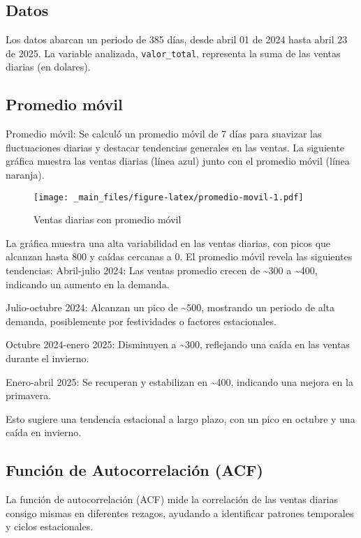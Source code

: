 \documentclass[
]{book}
\begin{document}
\subsection{Datos}\label{datos}

Los datos abarcan un periodo de 385 días, desde abril 01 de 2024 hasta
abril 23 de 2025. La variable analizada, \texttt{valor\_total},
representa la suma de las ventas diarias (en dolares).

\subsection{Promedio móvil}\label{promedio-muxf3vil}

Promedio móvil: Se calculó un promedio móvil de 7 días para suavizar las
fluctuaciones diarias y destacar tendencias generales en las ventas. La
siguiente gráfica muestra las ventas diarias (línea azul) junto con el
promedio móvil (línea naranja).

\begin{figure}
\centering
\texttt{[image: \_main\_files/figure-latex/promedio-movil-1.pdf]}
\caption{Ventas diarias con promedio móvil}
\end{figure}

La gráfica muestra una alta variabilidad en las ventas diarias, con
picos que alcanzan hasta 800 y caídas cercanas a 0. El promedio móvil
revela las siguientes tendencias: Abril-julio 2024: Las ventas promedio
crecen de \textasciitilde300 a \textasciitilde400, indicando un aumento
en la demanda.

Julio-octubre 2024: Alcanzan un pico de \textasciitilde500, mostrando un
periodo de alta demanda, posiblemente por festividades o factores
estacionales.

Octubre 2024-enero 2025: Disminuyen a \textasciitilde300, reflejando una
caída en las ventas durante el invierno.

Enero-abril 2025: Se recuperan y estabilizan en \textasciitilde400,
indicando una mejora en la primavera.

Esto sugiere una tendencia estacional a largo plazo, con un pico en
octubre y una caída en invierno.

\subsection{Función de Autocorrelación
(ACF)}\label{funciuxf3n-de-autocorrelaciuxf3n-acf}

La función de autocorrelación (ACF) mide la correlación de las ventas
diarias consigo mismas en diferentes rezagos, ayudando a identificar
patrones temporales y ciclos estacionales.
\end{document}
